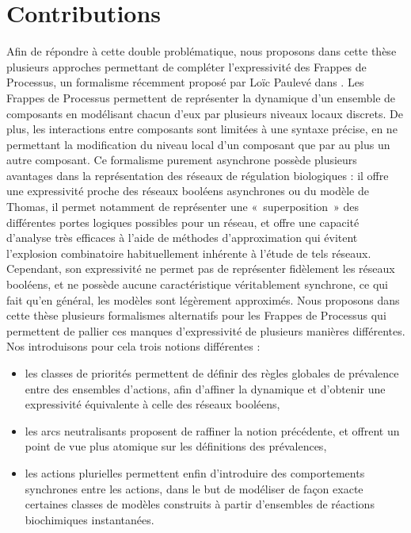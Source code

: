 \stodo{[Thomas'73], [Paulevé'11 et '12]}



\section{Contributions}

Afin de répondre à cette double problématique,
nous proposons dans cette thèse plusieurs approches permettant de compléter l'expressivité
des Frappes de Processus, un formalisme récemment proposé par Loïc Paulevé dans \toref.
Les Frappes de Processus permettent de représenter la dynamique d'un ensemble de composants
en modélisant chacun d'eux par plusieurs niveaux locaux discrets.
De plus, les interactions entre composants sont limitées à une syntaxe précise,
en ne permettant la modification du niveau local d'un composant que par au plus un autre composant.
Ce formalisme purement asynchrone possède plusieurs avantages dans la
représentation des réseaux de régulation biologiques :
il offre une expressivité proche des réseaux booléens asynchrones ou du modèle de Thomas,
il permet notamment de représenter une «~superposition~» des différentes portes logiques possibles
pour un réseau,
et offre une capacité d'analyse très efficaces à l'aide de méthodes d'approximation
qui évitent l'explosion combinatoire habituellement inhérente à l'étude de tels réseaux.
Cependant, son expressivité ne permet pas de représenter fidèlement les réseaux booléens,
et ne possède aucune caractéristique véritablement synchrone,
ce qui fait qu'en général, les modèles sont légèrement approximés.
Nous proposons dans cette thèse plusieurs formalismes alternatifs pour les Frappes de Processus
qui permettent de pallier ces manques d'expressivité de plusieurs manières différentes.
Nos introduisons pour cela trois notions différentes :
\begin{itemize}
  \item les classes de priorités permettent de définir des règles globales de prévalence
    entre des ensembles d'actions, afin d'affiner la dynamique et d'obtenir une expressivité
    équivalente à celle des réseaux booléens,
  \item les arcs neutralisants proposent de raffiner la notion précédente,
    et offrent un point de vue plus atomique sur les définitions des prévalences,
   \item les actions plurielles permettent enfin d'introduire des comportements synchrones
    entre les actions, dans le but de modéliser de façon exacte certaines classes
    de modèles construits à partir d'ensembles de réactions biochimiques instantanées.
\end{itemize}

